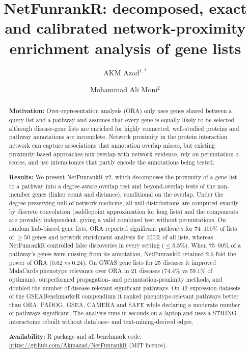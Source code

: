 \documentclass[11pt]{article}
\title{NetFunrankR: decomposed, exact and calibrated network-proximity enrichment analysis of gene lists}
\author{AKM Azad$^{1,*}$ \and Mohammad Ali Moni$^{2}$}
\date{}
\begin{document}
\maketitle
{}

\begin{abstract}
\noindent\textbf{Motivation:} Over-representation analysis (ORA) only uses genes shared between a query list and a pathway and assumes that every gene is equally likely to be selected, although disease-gene lists are enriched for highly connected, well-studied proteins and pathway annotations are incomplete. Network proximity in the protein interaction network can capture associations that annotation overlap misses, but existing proximity-based approaches mix overlap with network evidence, rely on permutation $z$-scores, and use interactomes that partly encode the annotations being tested.

\noindent\textbf{Results:} We present NetFunrankR v2, which decomposes the proximity of a gene list to a pathway into a degree-aware overlap test and beyond-overlap tests of the non-member genes (linker count and distance), conditional on the overlap. Under the degree-preserving null of network medicine, all null distributions are computed exactly by discrete convolution (saddlepoint approximation for long lists) and the components are provably independent, giving a valid combined test without permutations. On random hub-biased gene lists, ORA reported significant pathways for 74--100\% of lists of $\ge$50 genes and network enrichment analysis for 100\% of all lists, whereas NetFunrankR controlled false discoveries in every setting ($\le$5.5\%). When 75--90\% of a pathway's genes were missing from its annotation, NetFunrankR retained 2.6-fold the power of ORA (0.62 vs 0.24). On GWAS gene lists for 25 diseases it improved MalaCards phenotype relevance over ORA in 21 diseases (74.4\% vs 59.1\% of optimum), outperformed propagation- and permutation-proximity methods, and doubled the number of disease-relevant significant pathways. On 42 expression datasets of the GSEABenchmarkeR compendium it ranked phenotype-relevant pathways better than ORA, PADOG, GSEA, CAMERA and SAFE while declaring a moderate number of pathways significant. The analysis runs in seconds on a laptop and uses a STRING interactome rebuilt without database- and text-mining-derived edges.

\noindent\textbf{Availability:} R package and all benchmark code: \url{https://github.com/Akmazad/NetFunrankR} (MIT licence).
\end{abstract}
\end{document}
